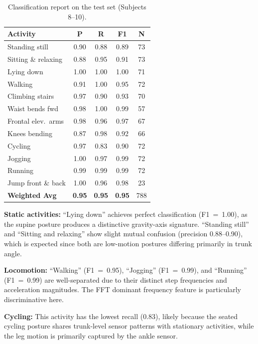 \documentclass[10pt,twocolumn,letterpaper]{article}
\begin{document}
\begin{table}[H]
\centering
\caption{Classification report on the test set (Subjects 8--10).}
\label{tab:results}
\small
\begin{tabular}{lcccc}
\toprule
\textbf{Activity} & \textbf{P} & \textbf{R} & \textbf{F1} & \textbf{N} \\
\midrule
Standing still       & 0.90 & 0.88 & 0.89 & 73 \\
Sitting \& relaxing  & 0.88 & 0.95 & 0.91 & 73 \\
Lying down           & 1.00 & 1.00 & 1.00 & 71 \\
Walking              & 0.91 & 1.00 & 0.95 & 72 \\
Climbing stairs      & 0.97 & 0.90 & 0.93 & 70 \\
Waist bends fwd      & 0.98 & 1.00 & 0.99 & 57 \\
Frontal elev.\ arms  & 0.98 & 0.96 & 0.97 & 67 \\
Knees bending        & 0.87 & 0.98 & 0.92 & 66 \\
Cycling              & 0.97 & 0.83 & 0.90 & 72 \\
Jogging              & 1.00 & 0.97 & 0.99 & 72 \\
Running              & 0.99 & 0.99 & 0.99 & 72 \\
Jump front \& back   & 1.00 & 0.96 & 0.98 & 23 \\
\midrule
\textbf{Weighted Avg} & \textbf{0.95} & \textbf{0.95} & \textbf{0.95} & 788 \\
\bottomrule
\end{tabular}
\end{table}

\textbf{Static activities:} ``Lying down'' achieves perfect classification (F1~=~1.00), as the supine posture produces a distinctive gravity-axis signature. ``Standing still'' and ``Sitting and relaxing'' show slight mutual confusion (precision 0.88--0.90), which is expected since both are low-motion postures differing primarily in trunk angle.

\textbf{Locomotion:} ``Walking'' (F1~=~0.95), ``Jogging'' (F1~=~0.99), and ``Running'' (F1~=~0.99) are well-separated due to their distinct step frequencies and acceleration magnitudes. The FFT dominant frequency feature is particularly discriminative here.

\textbf{Cycling:} This activity has the lowest recall (0.83), likely because the seated cycling posture shares trunk-level sensor patterns with stationary activities, while the leg motion is primarily captured by the ankle sensor.
\end{document}
